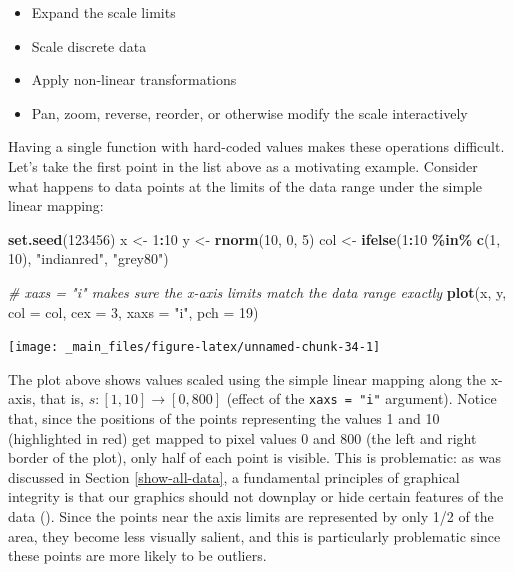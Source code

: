 \documentclass[
]{book}
\newenvironment{Shaded}{\begin{snugshade}}{\end{snugshade}}
\newcommand{\AttributeTok}[1]{\textcolor[rgb]{0.13,0.29,0.53}{#1}}
\newcommand{\CommentTok}[1]{\textcolor[rgb]{0.56,0.35,0.01}{\textit{#1}}}
\newcommand{\DecValTok}[1]{\textcolor[rgb]{0.00,0.00,0.81}{#1}}
\newcommand{\FunctionTok}[1]{\textcolor[rgb]{0.13,0.29,0.53}{\textbf{#1}}}
\newcommand{\NormalTok}[1]{#1}
\newcommand{\OtherTok}[1]{\textcolor[rgb]{0.56,0.35,0.01}{#1}}
\newcommand{\SpecialCharTok}[1]{\textcolor[rgb]{0.81,0.36,0.00}{\textbf{#1}}}
\newcommand{\StringTok}[1]{\textcolor[rgb]{0.31,0.60,0.02}{#1}}
\providecommand{\tightlist}{%
  \setlength{\itemsep}{0pt}\setlength{\parskip}{0pt}}
\theoremstyle{definition}
\theoremstyle{definition}
\theoremstyle{definition}
\theoremstyle{definition}
\theoremstyle{remark}
\begin{document}
\begin{itemize}
\tightlist
\item
  Expand the scale limits
\item
  Scale discrete data
\item
  Apply non-linear transformations
\item
  Pan, zoom, reverse, reorder, or otherwise modify the scale interactively
\end{itemize}

Having a single function with hard-coded values makes these operations difficult. Let's take the first point in the list above as a motivating example. Consider what happens to data points at the limits of the data range under the simple linear mapping:

\begin{Shaded}
\begin{Highlighting}[]
\FunctionTok{set.seed}\NormalTok{(}\DecValTok{123456}\NormalTok{)}
\NormalTok{x }\OtherTok{\textless{}{-}} \DecValTok{1}\SpecialCharTok{:}\DecValTok{10}
\NormalTok{y }\OtherTok{\textless{}{-}} \FunctionTok{rnorm}\NormalTok{(}\DecValTok{10}\NormalTok{, }\DecValTok{0}\NormalTok{, }\DecValTok{5}\NormalTok{)}
\NormalTok{col }\OtherTok{\textless{}{-}} \FunctionTok{ifelse}\NormalTok{(}\DecValTok{1}\SpecialCharTok{:}\DecValTok{10} \SpecialCharTok{\%in\%} \FunctionTok{c}\NormalTok{(}\DecValTok{1}\NormalTok{, }\DecValTok{10}\NormalTok{), }\StringTok{"indianred"}\NormalTok{, }\StringTok{"grey80"}\NormalTok{)}

\CommentTok{\# xaxs = "i" makes sure the x{-}axis limits match the data range exactly}
\FunctionTok{plot}\NormalTok{(x, y, }\AttributeTok{col =}\NormalTok{ col, }\AttributeTok{cex =} \DecValTok{3}\NormalTok{, }\AttributeTok{xaxs =} \StringTok{"i"}\NormalTok{, }\AttributeTok{pch =} \DecValTok{19}\NormalTok{)}
\end{Highlighting}
\end{Shaded}

\begin{center}\texttt{[image: \_main\_files/figure-latex/unnamed-chunk-34-1]} \end{center}

The plot above shows values scaled using the simple linear mapping along the x-axis, that is, \(s: [1, 10] \to [0, 800]\) (effect of the \texttt{xaxs\ =\ "i"} argument). Notice that, since the positions of the points representing the values 1 and 10 (highlighted in red) get mapped to pixel values 0 and 800 (the left and right border of the plot), only half of each point is visible. This is problematic: as was discussed in Section \ref{show-all-data}, a fundamental principles of graphical integrity is that our graphics should not downplay or hide certain features of the data (). Since the points near the axis limits are represented by only 1/2 of the area, they become less visually salient, and this is particularly problematic since these points are more likely to be outliers.
\end{document}
